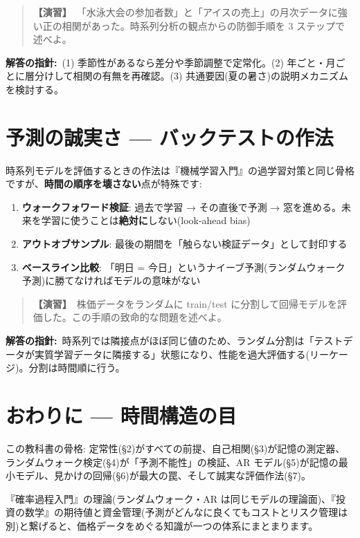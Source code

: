\documentclass{article}
\begin{document}
\begin{quote}
\textbf{【演習】}\ 「水泳大会の参加者数」と「アイスの売上」の月次データに強い正の相関があった。時系列分析の観点からの防御手順を 3 ステップで述べよ。
\end{quote}

\textbf{解答の指針:}\ (1) 季節性があるなら差分や季節調整で定常化。(2) 年ごと・月ごとに層分けして相関の有無を再確認。(3) 共通要因(夏の暑さ)の説明メカニズムを検討する。

\section{予測の誠実さ — バックテストの作法}

時系列モデルを評価するときの作法は『機械学習入門』の過学習対策と同じ骨格ですが、\textbf{時間の順序を壊さない}点が特殊です:

\begin{enumerate}
\item \textbf{ウォークフォワード検証}: 過去で学習 → その直後で予測 → 窓を進める。未来を学習に使うことは\textbf{絶対に}しない(look-ahead bias)
\item \textbf{アウトオブサンプル}: 最後の期間を「触らない検証データ」として封印する
\item \textbf{ベースライン比較}: 「明日 = 今日」というナイーブ予測(ランダムウォーク予測)に勝てなければモデルの意味がない
\end{enumerate}

\begin{quote}
\textbf{【演習】}\ 株価データをランダムに train/test に分割して回帰モデルを評価した。この手順の致命的な問題を述べよ。
\end{quote}

\textbf{解答の指針:}\ 時系列では隣接点がほぼ同じ値のため、ランダム分割は「テストデータが実質学習データに隣接する」状態になり、性能を過大評価する(リーケージ)。分割は時間順に行う。

\section{おわりに — 時間構造の目}

この教科書の骨格: 定常性(§2)がすべての前提、自己相関(§3)が記憶の測定器、ランダムウォーク検定(§4)が「予測不能性」の検証、AR モデル(§5)が記憶の最小モデル、見かけの回帰(§6)が最大の罠、そして誠実な評価作法(§7)。

『確率過程入門』の理論(ランダムウォーク・AR は同じモデルの理論面)、『投資の数学』の期待値と資金管理(予測がどんなに良くてもコストとリスク管理は別)と繋げると、価格データをめぐる知識が一つの体系にまとまります。
\end{document}
